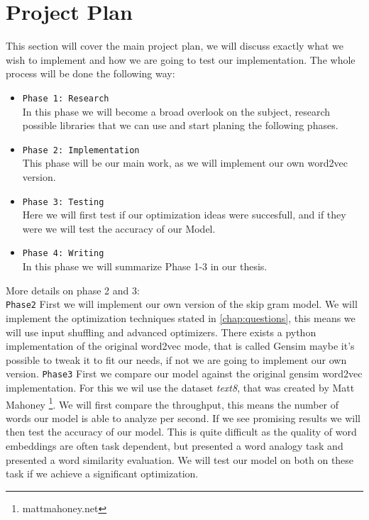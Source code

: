 \chapter{Project Plan}\label{chap:introduction}

This section will cover the main project plan, we will discuss exactly what we wish to implement and how we are going to test our implementation. 
The whole process will be done the following way: 
\begin{itemize}
\item \texttt{Phase 1: Research} \\ In this phase we will become a broad overlook on the subject, research possible libraries that we can use and start planing the following phases.
\item \texttt{Phase 2: Implementation} \\ This phase will be our main work, as we will implement our own word2vec version.
\item \texttt{Phase 3: Testing} \\ Here we will first test if our optimization ideas were succesfull, and if they were we will test the accuracy of our Model. 
\item \texttt{Phase 4: Writing} \\ In this phase we will summarize Phase 1-3 in our thesis. 
\end{itemize}
More details on phase 2 and 3:\\
\texttt{Phase2}
First we will implement our own version of the skip gram model. We will implement the optimization techniques stated in \ref{chap:questions}, this means we will use input shuffling and  advanced optimizers.  There exists a python implementation of the original word2vec mode, that is called Gensim \cite{gensim}maybe it's possible to tweak it to fit our needs, if not we are going to implement our own version. 
\texttt{Phase3}
First we compare our model against the original gensim word2vec implementation. For this we wil use the dataset \textit{text8}, that was created by Matt Mahoney \footnote{mattmahoney.net}. We will first compare the throughput, this means the number of words our model is able to analyze per second. If we see promising results we will then test the accuracy of our model. This is quite difficult as the quality of word embeddings are often task dependent, but \cite{mikolov2} presented a word analogy task  and \cite{wSimilarity} presented a  word similarity evaluation. We will test our model on both on these task if we achieve a significant optimization. 


